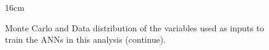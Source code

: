 \begin{figure}[hbtp]{16cm}
	\caption{Monte Carlo and Data distribution of the variables used as inputs to train the ANNs in this analysis (continue).}
	\centering
\end{figure}
